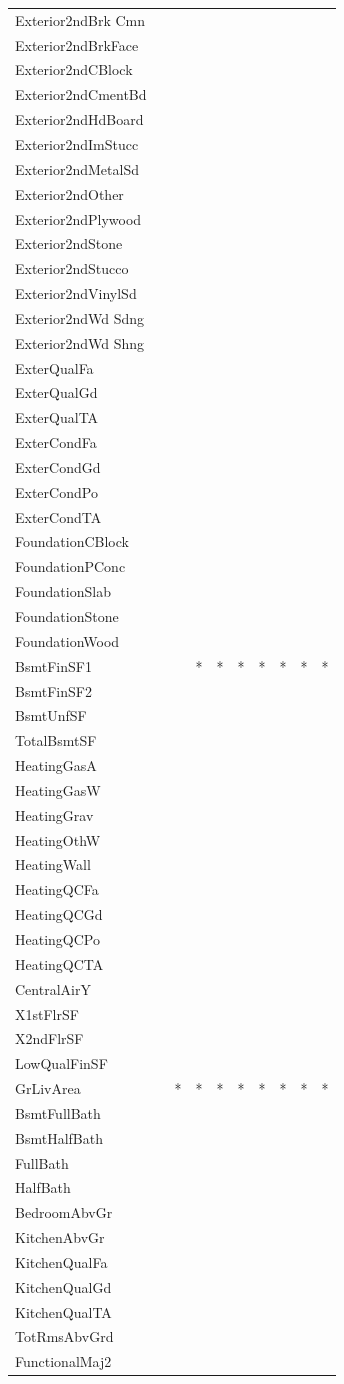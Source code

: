 \documentclass[]{article}
\begin{document}
\begin{longtable}[]{@{}llllllllll@{}}
Exterior2ndBrk Cmn & & & & & & & & &\tabularnewline
Exterior2ndBrkFace & & & & & & & & &\tabularnewline
Exterior2ndCBlock & & & & & & & & &\tabularnewline
Exterior2ndCmentBd & & & & & & & & &\tabularnewline
Exterior2ndHdBoard & & & & & & & & &\tabularnewline
Exterior2ndImStucc & & & & & & & & &\tabularnewline
Exterior2ndMetalSd & & & & & & & & &\tabularnewline
Exterior2ndOther & & & & & & & & &\tabularnewline
Exterior2ndPlywood & & & & & & & & &\tabularnewline
Exterior2ndStone & & & & & & & & &\tabularnewline
Exterior2ndStucco & & & & & & & & &\tabularnewline
Exterior2ndVinylSd & & & & & & & & &\tabularnewline
Exterior2ndWd Sdng & & & & & & & & &\tabularnewline
Exterior2ndWd Shng & & & & & & & & &\tabularnewline
ExterQualFa & & & & & & & & &\tabularnewline
ExterQualGd & & & & & & & & &\tabularnewline
ExterQualTA & & & & & & & & &\tabularnewline
ExterCondFa & & & & & & & & &\tabularnewline
ExterCondGd & & & & & & & & &\tabularnewline
ExterCondPo & & & & & & & & &\tabularnewline
ExterCondTA & & & & & & & & &\tabularnewline
FoundationCBlock & & & & & & & & &\tabularnewline
FoundationPConc & & & & & & & & &\tabularnewline
FoundationSlab & & & & & & & & &\tabularnewline
FoundationStone & & & & & & & & &\tabularnewline
FoundationWood & & & & & & & & &\tabularnewline
BsmtFinSF1 & & & * & * & * & * & * & * & *\tabularnewline
BsmtFinSF2 & & & & & & & & &\tabularnewline
BsmtUnfSF & & & & & & & & &\tabularnewline
TotalBsmtSF & & & & & & & & &\tabularnewline
HeatingGasA & & & & & & & & &\tabularnewline
HeatingGasW & & & & & & & & &\tabularnewline
HeatingGrav & & & & & & & & &\tabularnewline
HeatingOthW & & & & & & & & &\tabularnewline
HeatingWall & & & & & & & & &\tabularnewline
HeatingQCFa & & & & & & & & &\tabularnewline
HeatingQCGd & & & & & & & & &\tabularnewline
HeatingQCPo & & & & & & & & &\tabularnewline
HeatingQCTA & & & & & & & & &\tabularnewline
CentralAirY & & & & & & & & &\tabularnewline
X1stFlrSF & & & & & & & & &\tabularnewline
X2ndFlrSF & & & & & & & & &\tabularnewline
LowQualFinSF & & & & & & & & &\tabularnewline
GrLivArea & & * & * & * & * & * & * & * & *\tabularnewline
BsmtFullBath & & & & & & & & &\tabularnewline
BsmtHalfBath & & & & & & & & &\tabularnewline
FullBath & & & & & & & & &\tabularnewline
HalfBath & & & & & & & & &\tabularnewline
BedroomAbvGr & & & & & & & & &\tabularnewline
KitchenAbvGr & & & & & & & & &\tabularnewline
KitchenQualFa & & & & & & & & &\tabularnewline
KitchenQualGd & & & & & & & & &\tabularnewline
KitchenQualTA & & & & & & & & &\tabularnewline
TotRmsAbvGrd & & & & & & & & &\tabularnewline
FunctionalMaj2 & & & & & & & & &\tabularnewline

\end{longtable}
\end{document}

